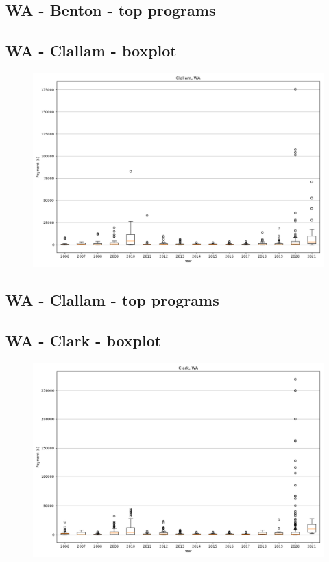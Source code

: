 \subsection*{WA - Benton - top programs}

\newpage
\subsection*{WA - Clallam - boxplot}
\begin{figure}[h]
\centering
\includegraphics[width=7in]{../output/boxplots/counties/Clallam-WA_boxplot.png}
\end{figure}


\subsection*{WA - Clallam - top programs}

\newpage
\subsection*{WA - Clark - boxplot}
\begin{figure}[h]
\centering
\includegraphics[width=7in]{../output/boxplots/counties/Clark-WA_boxplot.png}
\end{figure}


